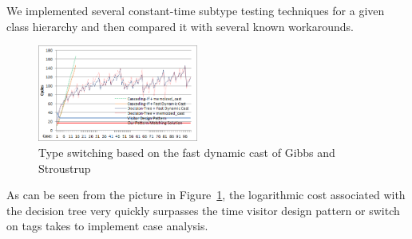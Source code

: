 We implemented several constant-time subtype testing techniques for a given 
class hierarchy and then compared it with several known workarounds.

\begin{figure}[htbp]
  \centering
    \includegraphics[width=0.47\textwidth]{DCast-vs-Visitors2.png}
  \caption{Type switching based on the fast dynamic cast of Gibbs and Stroustrup~\cite{FastDynCast}}
  \label{fig:DCastVis2}
\end{figure}

As can be seen from the picture in Figure~\ref{fig:DCastVis2}, the logarithmic 
cost associated with the decision tree very quickly surpasses the time visitor 
design pattern or switch on tags takes to implement case analysis.